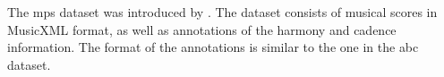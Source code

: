 

The \gls{mps} dataset was introduced by
\textcite{hentschel2021annotated}. The dataset consists of
musical scores in MusicXML format, as well as annotations of
the harmony and cadence information. The format of the
annotations is similar to the one in the \gls{abc} dataset. 